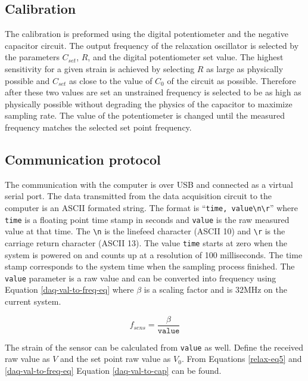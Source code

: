 
\subsection{Calibration}
The calibration is preformed using the digital potentiometer and the negative capacitor circuit.  The output frequency of the relaxation oscillator is selected by the parameters $C_{set}$, $R$, and the digital potentiometer set value.  The highest sensitivity for a given strain is achieved by selecting $R$ as large as physically possible and $C_{set}$ as close to the value of $C_0$ of the circuit as possible.  Therefore after these two values are set an unstrained frequency is selected to be as high as physically possible without degrading the physics of the capacitor to maximize sampling rate.  The value of the potentiometer is changed until the measured frequency matches the selected set point frequency.  

\subsection{Communication protocol}
The communication with the computer is over USB and connected as a virtual serial port.  The data transmitted from the data acquisition circuit to the computer is an ASCII formated string.  The format is ``\texttt{time, value\textbackslash n\textbackslash r}'' where \texttt{time} is a floating point time stamp in seconds and \texttt{value} is the raw measured value at that time.  The \texttt{\textbackslash n} is the linefeed character (ASCII 10) and \texttt{\textbackslash r} is the carriage return character (ASCII 13).  The value \texttt{time} starts at zero when the system is powered on and counts up at a resolution of 100 milliseconds.  The time stamp corresponds to the system time when the sampling process finished.  The \texttt{value} parameter is a raw value and can be converted into frequency using Equation \ref{daq-val-to-freq-eq} where $\beta$ is a scaling factor and is $32\text{MHz}$ on the current system.

\begin{equation}
	f_{sens}=\frac{\beta}{\texttt{value}}\label{daq-val-to-freq-eq}
\end{equation}

The strain of the sensor can be calculated from \texttt{value} as well.  Define the received raw value as $V$ and the set point raw value as $V_0$.  From Equations \ref{relax-eq5} and \ref{daq-val-to-freq-eq} Equation \ref{daq-val-to-cap} can be found.

